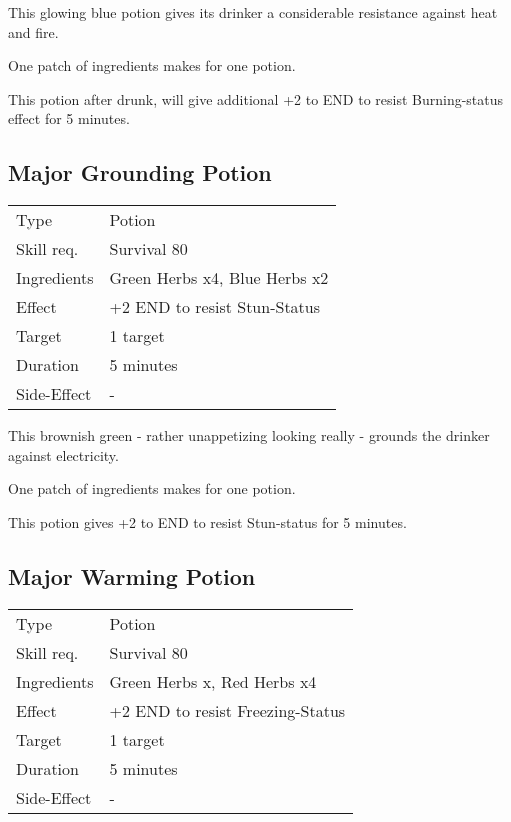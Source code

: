 \documentclass[11pt,a4paper,twocolumn]{book}
\begin{document}
\medskip

This glowing blue potion gives its drinker a considerable resistance against heat and fire.

One patch of ingredients makes for one potion.

This potion after drunk, will give additional +2 to END to resist Burning-status effect for 5 minutes.


\subsection*{Major Grounding Potion}
{
	\begin{tabu} to 75mm{| X[l,4] | X[l,8] |}
		\hline
		Type 			& Potion 													\\
		Skill req.	    & Survival 80 												\\
		Ingredients     & Green Herbs x4, Blue Herbs x2								\\
		Effect     		& +2 END to resist Stun-Status 								\\
		Target      	& 1 target													\\
		Duration  		& 5 minutes	 												\\
		Side-Effect     & -															\\ \hline
	\end{tabu}
	
}

\medskip

This brownish green - rather unappetizing looking really - grounds the drinker against electricity.

One patch of ingredients makes for one potion.

This potion gives +2 to END to resist Stun-status for 5 minutes.

\vfill

\subsection*{Major Warming Potion}
{
	\begin{tabu} to 75mm{| X[l,4] | X[l,8] |}
		\hline
		Type 			& Potion 													\\
		Skill req.	    & Survival 80 												\\
		Ingredients     & Green Herbs x, Red Herbs x4								\\
		Effect     		& +2 END to resist Freezing-Status 							\\
		Target      	& 1 target													\\
		Duration  		& 5 minutes	 												\\
		Side-Effect     & -															\\ \hline
	\end{tabu}
	
}
\end{document}
